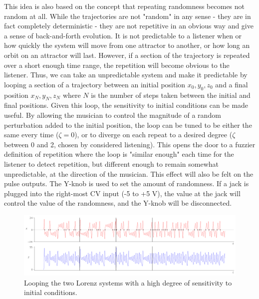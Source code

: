 \documentclass{tufte-handout}
\begin{document}
This idea is also based on the concept that repeating randomness becomes not random at all. While the trajectories are not "random" in any sense - they are in fact completely deterministic - they are not repetitive in an obvious way and give a sense of back-and-forth evolution. It is not predictable to a listener when or how quickly the system will move from one attractor to another, or how long an orbit on an attractor will last. However, if a section of the trajectory is repeated over a short enough time range, the repetition will become obvious to the listener. Thus, we can take an unpredictable system and make it predictable by looping a section of a trajectory between an initial position $x_0, y_0, z_0$ and a final position $x_N, y_N, z_N$ where $N$ is the number of steps taken between the initial and final positions. Given this loop, the sensitivity to initial conditions can be made useful. By allowing the musician to control the magnitude of a random perturbation added to the initial position, the loop can be tuned to be either the same every time ($\zeta=0$), or to diverge on each repeat to a desired degree ($\zeta$ between 0 and 2, chosen by considered listening). This opens the door to a fuzzier definition of repetition where the loop is "similar enough" each time for the listener to detect repetition, but different enough to remain somewhat unpredictable, at the direction of the musician. This effect will also be felt on the pulse outputs. The Y-knob is used to set the amount of randomness. If a jack is plugged into the right-most CV input (-5 to +5 V), the value at the jack will control the value of the randomness, and the Y-knob will be disconnected.

\begin{figure}[h]
  \includegraphics[width=\linewidth]{very_dependent_loop.png}%
  \caption{Looping the two Lorenz systems with a high degree of sensitivity to initial conditions.}%
  \label{fig:very_dependent_loop}%
\end{figure}
\end{document}

